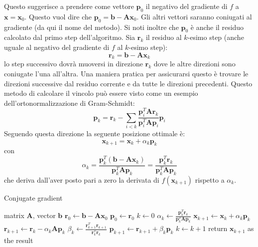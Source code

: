 \documentclass[10pt]{article}
\begin{document}
Questo suggerisce a prendere come vettore $\mathbf{p}_0$ il negativo del gradiente di $f$ a $\mathbf{x}=\mathbf{x}_0$. Questo vuol dire che $\mathbf{p}_0=\mathbf{b}-\mathbf{Ax}_0$. Gli altri vettori saranno coniugati al gradiente (da qui il nome del metodo). Si noti inoltre che $\mathbf{p}_0$ è anche il residuo calcolato dal primo step dell'algoritmo.
Sia $\mathbf{r}_k$ il residuo al $k$-esimo step (anche uguale al negativo del gradiente di $f$ al $k$-esimo step):
\begin{equation}
\mathbf{r}_k = \mathbf{b} - \mathbf{Ax}_k
\end{equation}
lo step successivo dovrà muoversi in direzione $\mathbf{r}_k$ dove le altre direzioni sono coniugate l'una all'altra.
Una maniera pratica per assicurarsi questo è trovare le direzioni successive dal residuo corrente e da tutte le direzioni precedenti. Questo metodo di calcolare il vincolo può essere visto come un esempio dell'ortonormalizzazione di Gram-Schmidt:
\begin{equation}
\mathbf{p}_k = \mathbf{r}_k - \sum_{i<k} \frac{\mathbf{p}_i^T\mathbf{A}\mathbf{r}_k}{\mathbf{p}_i^T\mathbf{A}\mathbf{p}_i}\mathbf{p}_i
\end{equation}
Seguendo questa direzione la seguente posizione ottimale è:
\begin{equation}
\mathbf{x}_{k+1} = \mathbf{x}_k + \alpha_k \mathbf{p}_k
\end{equation}
con
\begin{equation}
\alpha_k = \frac{\mathbf{p}_k^T(\mathbf{b}-\mathbf{Ax}_k)}{\mathbf{p}_k^T\mathbf{Ap}_k} = 
\frac{\mathbf{p}_k^T\mathbf{r}_k}{\mathbf{p}_k^T\mathbf{Ap}_k}
\end{equation}
che deriva dall'aver posto pari a zero la derivata di $f(\mathbf{x}_{k+1})$ rispetto a $\alpha_k$.


\begin{algorithm}
\caption{Conjugate gradient}\label{alg:mul_simple}
\begin{algorithmic}[1]
\Require matrix $\mathbf{A}$, vector $\mathbf{b}$
\State $\mathbf{r}_0 \gets \mathbf{b} - \mathbf{Ax}_0$
\State $\mathbf{p}_0 \gets \mathbf{r}_0$
\State $k \gets 0$
	\State $\alpha_k \gets \frac{\mathbf{p}_k^T\mathbf{r}_k}{\mathbf{p}_k^T\mathbf{Ap}_k}$
	\State $\mathbf{x}_{k+1} \gets \mathbf{x}_k + \alpha_k \mathbf{p}_k$
	\State $\mathbf{r}_{k+1} \gets \mathbf{r}_k - \alpha_k \mathbf{Ap}_k$
	\State $\beta_k \gets \frac{\mathbf{r}_{k+1}^T\mathbf{r}_{k+1}}{\mathbf{r}_k^T\mathbf{r}_k}$
	\State $\mathbf{p}_{k+1} \gets \mathbf{r}_{k+1} + \beta_k \mathbf{p}_k$
	\State $k \gets k + 1$
\EndWhile
\State return $\mathbf{x}_{k+1}$ as the result
\end{algorithmic}
\end{algorithm}
\end{document}
